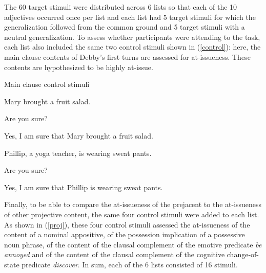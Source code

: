 \documentclass[11pt,fleqn]{article}
\newcommand{\6}{\mbox{$[\hspace*{-.6mm}[$}}
\newcommand{\9}{\mbox{$]\hspace*{-.6mm}]$}}
\begin{document}
The 60 target stimuli were distributed across 6 lists so that each of the 10 adjectives occurred once per list and each list had 5 target stimuli for which the generalization followed from the common ground and 5 target stimuli with a neutral generalization. To assess whether participants were attending to the task, each list also included the same two control stimuli shown in (\ref{control}): here, the main clause contents of Debby's first turns are assessed for at-issueness. These contents are hypothesized to be highly at-issue. 

\begin{exe}
\ex\label{control} Main clause control stimuli
\begin{xlist}
\ex
\begin{xlist}
 Mary brought a fruit salad.

 Are you sure?

 Yes, I am sure that Mary brought a fruit salad.
\end{xlist}
\ex 
\begin{xlist}
 Phillip, a yoga teacher, is wearing sweat pants.

 Are you sure?

 Yes, I am sure that Phillip is wearing sweat pants.
\end{xlist}
\end{xlist}
\end{exe}

Finally, to be able to compare the at-issueness of the prejacent to the at-issueness of other projective content, the same four control stimuli were added to each list. As shown in (\ref{proj}), these four control stimuli assessed the at-issueness of the content of a nominal appositive, of the possession implication of a possessive noun phrase, of the content of the clausal complement of the emotive predicate {\em be annoyed} and of the content of the clausal complement of the cognitive change-of-state predicate {\em discover}. In sum, each of the 6 lists consisted of 16 stimuli.
\end{document}
